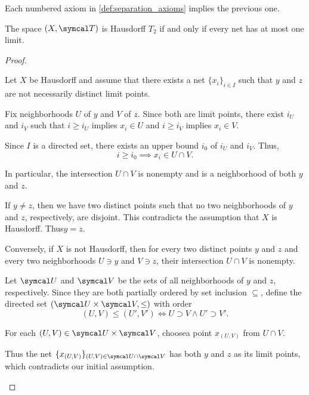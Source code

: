 \begin{proposition}\label{thm:separation_axioms_cascade}
  Each numbered axiom in \cref{def:separation_axioms} implies the previous one.
\end{proposition}

\begin{proposition}\label{thm:t2_iff_singleton_limits}
  The space \( (X, \Cal{T}) \) is Hausdorff \( T_2 \) if and only if every net has at most one limit.
\end{proposition}
\begin{proof}
  \begin{description}
    \Implies Let \( X \) be Hausdorff and assume that there exists a net \( \{ x_i \}_{i \in I} \) such that \( y \) and \( z \) are not necessarily distinct limit points.

    Fix neighborhoods \( U \) of \( y \) and \( V \) of \( z \). Since both are limit points, there exist \( i_U \) and \( i_V \) such that \( i \geq i_U \) implies \( x_i \in U \) and \( i \geq i_V \) implies \( x_i \in V \).

    Since \( I \) is a directed set, there exists an upper bound \( i_0 \) of \( i_U \) and \( i_V \). Thus,
    \begin{equation*}
      i \geq i_0 \implies x_i \in U \cap V.
    \end{equation*}

    In particular, the intersection \( U \cap V \) is nonempty and is a neighborhood of both \( y \) and \( z \).

    If \( y \neq z \), then we have two distinct points such that no two neighborhoods of \( y \) and \( z \), respectively, are disjoint. This contradicts the assumption that \( X \) is Hausdorff. Thus\LEM \( y = z \).

    \ImpliedBy Conversely, if \( X \) is not Hausdorff\LEM, then for every two distinct points \( y \) and \( z \) and every two neighborhoods \( U \ni y \) and \( V \ni z \), their intersection \( U \cap V \) is nonempty.

    Let \( \Cal{U} \) and \( \Cal{V} \) be the sets of all neighborhoods of \( y \) and \( z \), respectively. Since they are both partially ordered by set inclusion \( \subseteq \), define the directed set \( (\Cal{U} \times \Cal{V}, \leq) \) with order
    \begin{equation*}
      (U, V) \leq (U', V') \iff U \supset V \land U' \supset V'.
    \end{equation*}

    For each \( (U, V) \in \Cal{U} \times \Cal{V} \), choose\AOC a point \( x_{(U, V)} \) from \( U \cap V \).

    Thus the net \( \{ x_{(U, V)} \}_{(U, V) \in \Cal{U} \cap \Cal{V}} \) has both \( y \) and \( z \) as its limit points, which contradicts our initial assumption.
  \end{description}
\end{proof}
